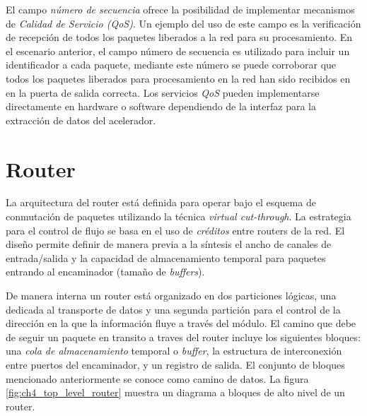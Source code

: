 El campo \textit{número de secuencia} ofrece la posibilidad de implementar mecanismos de \textit{Calidad de Servicio (QoS)}. Un ejemplo del uso de este campo es la verificación de recepción de todos los paquetes liberados a la red para su procesamiento. En el escenario anterior, el campo número de secuencia es utilizado para incluir un identificador a cada paquete, mediante este número se puede corroborar que todos los paquetes liberados para procesamiento en la red han sido recibidos en en la puerta de salida correcta. Los servicios \textit{QoS} pueden implementarse directamente en hardware o software dependiendo de la interfaz para la extracción de datos del acelerador.


\section{Router}\label{sec:router}

La arquitectura del router está definida para operar bajo el esquema de conmutación de paquetes utilizando la técnica \textit{virtual cut-through}. La estrategia para el control de flujo se basa en el uso de \textit{créditos} entre routers de la red. El diseño permite definir de manera previa a la síntesis el ancho de canales de entrada/salida y la capacidad de almacenamiento temporal para paquetes entrando al encaminador (tamaño de \textit{buffers}).

De manera interna un router está organizado en dos particiones lógicas, una dedicada al transporte de datos y una segunda partición para el control de la dirección en la que la información fluye a través del módulo. El camino que debe de seguir un paquete en transito a traves del router incluye los siguientes bloques: una \textit{cola de almacenamiento} temporal o \textit{buffer}, la estructura de interconexión entre puertos del encaminador, y un registro de salida. El conjunto de bloques mencionado anteriormente se conoce como camino de datos. La figura \ref{fig:ch4_top_level_router} muestra un diagrama a bloques de alto nivel de un router.


